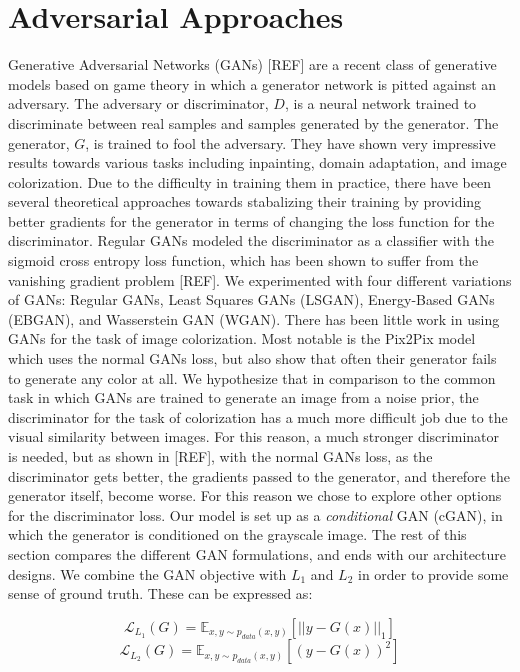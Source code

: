 \documentclass[10pt]{article}
\begin{document}
\section{Adversarial Approaches}
Generative Adversarial Networks (GANs) [REF] are a recent class of generative models based on game theory
in which a generator network is pitted against an adversary. The adversary or discriminator, $D$, is a 
neural network trained to discriminate between real samples and samples generated by the generator. The
generator, $G$, is trained to fool the adversary. They have shown very impressive results towards
various tasks including inpainting, domain adaptation, and image colorization. Due to the difficulty in
training them in practice, there have been several theoretical approaches towards stabalizing their training
by providing better gradients for the generator in terms of changing the loss function for the discriminator.
Regular GANs modeled the discriminator as a classifier with the sigmoid cross entropy loss function,
which has been shown to suffer from the vanishing gradient problem [REF]. We experimented with four different
variations of GANs: Regular GANs, Least Squares GANs (LSGAN), Energy-Based GANs (EBGAN), and Wasserstein GAN
(WGAN). There has been little work in using GANs for the task of image colorization. Most notable is the
Pix2Pix model which uses the normal GANs loss, but also show that often their generator fails to generate
any color at all. We hypothesize that in comparison to the common task in which GANs are trained to generate
an image from a noise prior, the discriminator for the task of colorization has a much more difficult job
due to the visual similarity between images. For this reason, a much stronger discriminator is needed, but
as shown in [REF], with the normal GANs loss, as the discriminator gets better, the gradients passed to the
generator, and therefore the generator itself, become worse. For this reason we chose to explore other
options for the discriminator loss. Our model is set up as a \textit{conditional} GAN (cGAN), in which the
generator is conditioned on the grayscale image. The rest of this section compares the different GAN
formulations, and ends with our architecture designs. We combine the GAN objective with $L_1$ and $L_2$ in
order to provide some sense of ground truth. These can be expressed as:

\[ \mathcal{L}_{L_1}(G) = \mathbb{E}_{x,y\sim p_{data}(x,y)}[||y-G(x)||_1] \]
\[ \mathcal{L}_{L_2}(G) = \mathbb{E}_{x,y\sim p_{data}(x,y)}[(y-G(x))^2] \]
\end{document}
